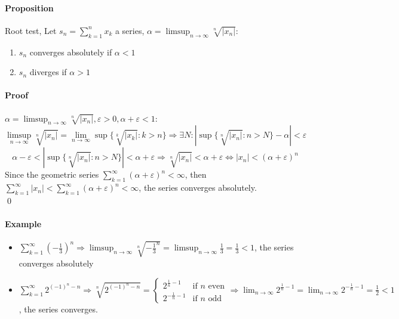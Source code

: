 \documentclass{article}
\newcommand{\DS}{\displaystyle}
\newcommand{\abs}[1]{\left|#1\right|}
\newcommand{\limn}{\lim_{n \to \infty}}
\newcommand{\limsupn}{\limsup_{n \to \infty}}
\newcommand{\sumn}[1]{\sum_{k=1}^n #1}
\newcommand{\series}[1]{\sum_{k=1}^\infty #1}
\newcommand{\Ep}{\varepsilon}
\newcommand{\Proposition}{\paragraph{Proposition}}
\newcommand{\Proof}{\paragraph{Proof}}
\newcommand{\Example}{\paragraph{Example}}
\begin{document}
  \Proposition Root test, Let $\DS s_n = \sumn{x_k}$ a series, $\DS \alpha =
  \limsupn \sqrt[n]{\abs{x_n}}$:
  \begin{enumerate}[label=(\roman*)]
    \item $s_n$ converges absolutely if $\alpha < 1$
    \item $s_n$ diverges if $\alpha > 1$
  \end{enumerate}

  \Proof $\alpha = \limsupn \sqrt[n]{\abs{x_n}}, \Ep > 0, \alpha + \Ep
  < 1$:
  \begin{equation*}
    \limsupn \sqrt[n]{\abs{x_n}} = \limn \sup\{\sqrt[k]{\abs{x_k}} : k > n\}
    \Rightarrow \exists N : \abs{\sup\{\sqrt[n]{\abs{x_n}} : n > N\} - \alpha} <
    \Ep
  \end{equation*}
  \begin{equation*}
    \alpha - \Ep < \abs{\sup\{\sqrt[n]{\abs{x_n}} : n > N\}} < \alpha + \Ep
    \Rightarrow \sqrt[n]{\abs{x_n}} < \alpha + \Ep \iff
    \abs{x_n} < (\alpha + \Ep)^n
  \end{equation*}
  Since the geometric series $\DS \series (\alpha + \Ep)^n < \infty$, then
  $\DS \series \abs{x_n} < \series (\alpha + \Ep)^n < \infty$, the series
  converges absolutely.
\\\qed

  \Example
  \begin{itemize}
    \item $\DS \series\left({-\frac{1}{3}}\right)^n \Rightarrow
    \limsupn \sqrt[n]{-\frac{1}{3}^n} = \limsupn \frac{1}{3} = \frac{1}{3} < 1$,
    the series converges absolutely
    \item $\DS \series 2^{(-1)^n-n} \Rightarrow \sqrt[n]{2^{(-1)^n-n}} =
    \begin{cases}
      2^{\frac{1}{n}-1}  & \text{if } n \text{ even} \\
      2^{-\frac{1}{n}-1} & \text{if } n \text{ odd}
    \end{cases} \Rightarrow
    \limn 2^{\frac{1}{n}-1} = \limn 2^{-\frac{1}{n}-1} = \frac{1}{2} < 1$,
    the series converges.
  \end{itemize}

\newpage
\end{document}
